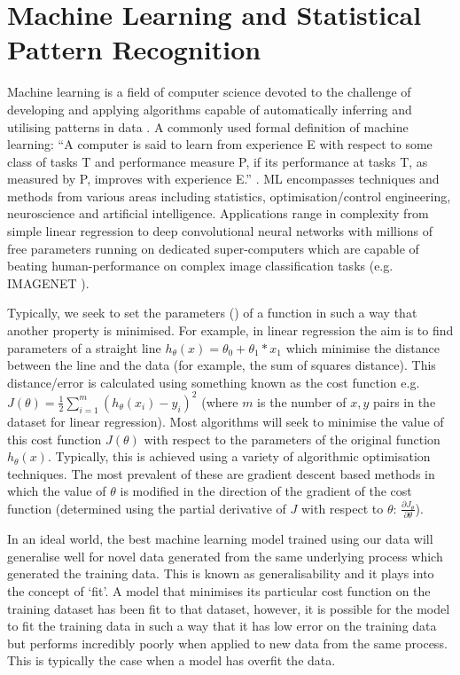 \section{Machine Learning and Statistical Pattern Recognition}

Machine learning is a field of computer science 
devoted to the challenge of developing and applying algorithms capable of 
automatically inferring and utilising patterns in data \citep{Murphy2012}.
A commonly used formal definition of machine learning:
``A computer is said to learn from experience E with respect to some class of tasks 
T and performance measure P, if its performance at tasks T, as measured by P, improves 
with experience E.'' \citep{Mitchell1997}.
ML encompasses techniques and methods from various areas including statistics,
optimisation/control engineering, neuroscience and artificial intelligence.
Applications range in complexity from simple linear regression to deep convolutional neural networks 
with millions of free parameters running on dedicated super-computers \citep{Wu2014} 
which are capable of beating human-performance on complex image classification tasks 
(e.g. IMAGENET \citep{Berg2014,He2015}).

Typically, we seek to set the parameters (\theta) of a function in such a way
that another property is minimised.  For example, in linear regression the aim is to find 
parameters of a straight line \(h_{\theta}(x) = \theta_{0} + \theta_{1} * x_{1}\) which minimise the distance
between the line and the data (for example, the sum of squares distance).
This distance/error is calculated using something known as the cost function e.g. \(J(\theta) = \frac{1}{2} \sum^{m}_{i=1} (h_{\theta}(x_{i}) - y_{i})^2\) 
(where \(m\) is the number of \(x, y\) pairs in the dataset for linear regression).
Most algorithms will seek to minimise the value of this cost function \(J(\theta)\) with respect to 
the parameters of the original function \(h_{\theta}(x)\).  Typically, this is achieved using a variety of algorithmic optimisation techniques.
The most prevalent of these are gradient descent based methods in which the value of \(\theta\) is modified 
in the direction of the gradient of the cost function (determined using the 
partial derivative of \(J\) with respect to \(\theta\): \(\frac{\partial J_{\theta}}{\partial\theta}\)).  


In an ideal world, the best machine learning model trained using our data will 
generalise well for novel data generated from the same underlying process
which generated the training data.  
This is known as generalisability and it plays into the concept of `fit'.  
A model that minimises its particular cost function on the training dataset has 
been fit to that dataset, however, it is possible for the model to fit the training
data in such a way that it has low error on the training data but performs 
incredibly poorly when applied to new data from the same process.
This is typically the case when a model has overfit the data.  


